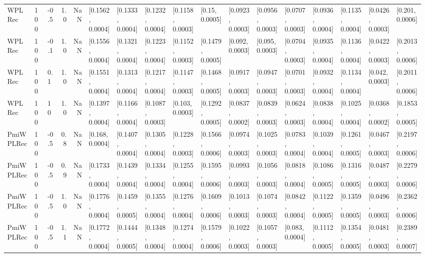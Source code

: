 \begin{tabular}{lllrrllllllllllll}
    WPLRec &  100 &  -0.5 &   1.0 &   NaN &  [0.1562, 0.0004] &  [0.1333, 0.0004] &  [0.1232, 0.0004] &  [0.1158, 0.0003] &    [0.15, 0.0005] &  [0.0923, 0.0003] &  [0.0956, 0.0003] &  [0.0707, 0.0003] &  [0.0936, 0.0004] &  [0.1135, 0.0004] &  [0.0426, 0.0003] &   [0.201, 0.0006] \\
    WPLRec &  100 &  -0.1 &   1.0 &   NaN &  [0.1556, 0.0004] &  [0.1321, 0.0004] &  [0.1223, 0.0004] &  [0.1152, 0.0003] &  [0.1479, 0.0005] &   [0.092, 0.0003] &   [0.095, 0.0003] &  [0.0704, 0.0003] &  [0.0935, 0.0004] &  [0.1136, 0.0004] &  [0.0422, 0.0003] &  [0.2013, 0.0006] \\
    WPLRec &  100 &   0.1 &   1.0 &   NaN &  [0.1551, 0.0004] &  [0.1313, 0.0004] &  [0.1217, 0.0004] &  [0.1147, 0.0003] &  [0.1468, 0.0005] &  [0.0917, 0.0003] &  [0.0947, 0.0003] &  [0.0701, 0.0003] &  [0.0932, 0.0004] &  [0.1134, 0.0004] &   [0.042, 0.0003] &  [0.2011, 0.0006] \\
    WPLRec &  100 &    10 &   1.0 &   NaN &  [0.1397, 0.0004] &  [0.1166, 0.0004] &  [0.1087, 0.0003] &   [0.103, 0.0003] &  [0.1292, 0.0005] &  [0.0837, 0.0002] &  [0.0839, 0.0003] &  [0.0624, 0.0003] &  [0.0838, 0.0004] &  [0.1025, 0.0004] &  [0.0368, 0.0002] &  [0.1853, 0.0005] \\
 PmiWPLRec &  100 &  -0.5 &   0.8 &   NaN &   [0.168, 0.0004] &  [0.1407, 0.0004] &  [0.1305, 0.0004] &  [0.1228, 0.0003] &  [0.1566, 0.0006] &  [0.0974, 0.0003] &  [0.1025, 0.0003] &  [0.0783, 0.0004] &  [0.1039, 0.0004] &  [0.1261, 0.0005] &  [0.0467, 0.0003] &  [0.2197, 0.0006] \\
 PmiWPLRec &  100 &  -0.5 &   0.9 &   NaN &  [0.1733, 0.0004] &  [0.1439, 0.0004] &  [0.1334, 0.0004] &  [0.1255, 0.0004] &  [0.1595, 0.0006] &  [0.0993, 0.0003] &  [0.1056, 0.0003] &  [0.0818, 0.0004] &  [0.1086, 0.0005] &  [0.1316, 0.0005] &  [0.0487, 0.0003] &  [0.2279, 0.0006] \\
 PmiWPLRec &  100 &  -0.5 &   1.0 &   NaN &  [0.1776, 0.0004] &  [0.1459, 0.0005] &  [0.1355, 0.0004] &  [0.1276, 0.0004] &  [0.1609, 0.0006] &  [0.1013, 0.0003] &  [0.1074, 0.0003] &  [0.0842, 0.0004] &  [0.1122, 0.0005] &  [0.1359, 0.0005] &  [0.0496, 0.0003] &  [0.2362, 0.0006] \\
 PmiWPLRec &  100 &  -0.5 &   1.1 &   NaN &  [0.1772, 0.0004] &  [0.1444, 0.0005] &  [0.1348, 0.0004] &  [0.1274, 0.0004] &  [0.1579, 0.0006] &  [0.1022, 0.0003] &  [0.1057, 0.0003] &   [0.083, 0.0004] &  [0.1112, 0.0005] &  [0.1354, 0.0005] &  [0.0481, 0.0003] &  [0.2389, 0.0007] \\

\end{tabular}
